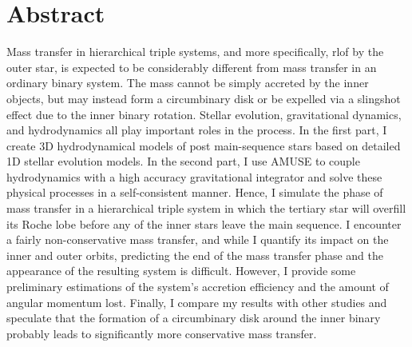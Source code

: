\chapter*{Abstract}

Mass transfer in hierarchical triple systems, and more specifically, \ac{rlof} by the outer star, is expected to be considerably different from mass transfer in an ordinary binary system. The mass cannot be simply accreted by the inner objects, but may instead form a circumbinary disk or be expelled via a slingshot effect due to the inner binary rotation. Stellar evolution, gravitational dynamics, and hydrodynamics all play important roles in the process. In the first part, I create 3D hydrodynamical models of post main-sequence stars based on detailed 1D stellar evolution models. In the second part, I use AMUSE to couple hydrodynamics with a high accuracy gravitational integrator and solve these physical processes in a self-consistent  manner. Hence, I simulate the phase of mass transfer in a hierarchical triple system in which the tertiary star will overfill its Roche lobe before any of the inner stars leave the main sequence. I encounter a fairly non-conservative mass transfer, and while I quantify its impact on the inner and outer orbits, predicting the end of the mass transfer phase and the appearance of the resulting system is difficult. However, I provide some preliminary estimations of the system's accretion efficiency and the amount of angular momentum lost. Finally, I compare my results with other studies and speculate that the formation of a circumbinary disk around the inner binary probably leads to significantly more conservative mass transfer. 





